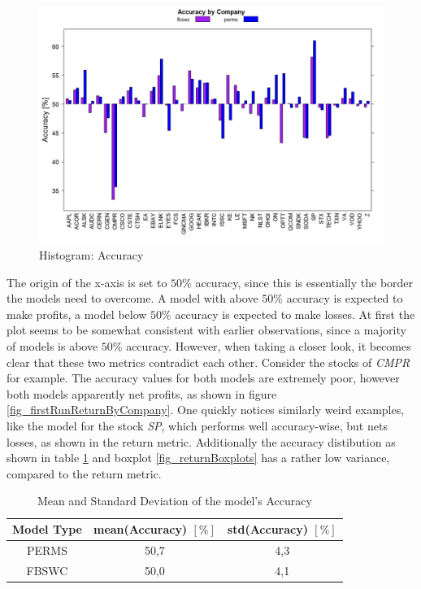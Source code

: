 \begin{figure}[h]
	\centering
  	\includegraphics[width=\textwidth]{accuracyByCompany}
	\caption[Accuracy Barchart]{Histogram: Accuracy }
	\label{fig_accuracyByCompany}
\end{figure}

The origin of the x-axis is set to $50\%$ accuracy, since this is essentially the border the models need to overcome. A model with above $50\%$ accuracy is expected to make profits, a model below $50\%$ accuracy is expected to make losses. At first the plot seems to be somewhat consistent with earlier observations, since a majority of models is above $50\%$ accuracy. However, when taking a closer look, it becomes clear that these two metrics contradict each other. Consider the stocks of \textit{CMPR} for example. The accuracy values for both models are extremely poor, however both models apparently net profits, as shown in figure \ref{fig_firstRunReturnByCompany}. One quickly notices similarly weird examples, like the model for the stock \textit{SP}, which performs well accuracy-wise, but nets losses, as shown in the return metric. Additionally the accuracy distibution as shown in table \ref{table_firstRunAccuracy} and boxplot \ref{fig_returnBoxplots} has a rather low variance, compared to the return metric.

\begin{table}	
\vspace{0.5cm}
\caption[Model Performance (Accuracy)]{Mean and Standard Deviation of the model's Accuracy\label{table_firstRunAccuracy}}
\centering
\begin{tabular}{ c | c | c}		
  Model Type & mean(Accuracy) $[\%]$ & std(Accuracy) $[\%]$\\
  \hline
  PERMS & 50,7 & 4,3\\
  FBSWC & 50,0 & 4,1\\
\end{tabular}
\vspace{0.5cm}
\end{table}

